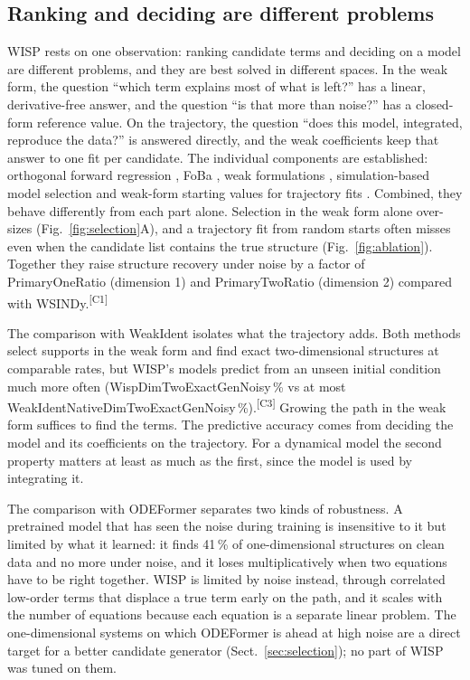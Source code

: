 \documentclass[10pt]{article}
\newcommand{\pv}[1]{\textcolor{prelim}{#1}}
\newcommand{\claimtag}[1]{\textsuperscript{\textcolor{prelim}{\sffamily\tiny[#1]}}}
\newcommand{\pv}[1]{#1}
\newcommand{\claimtag}[1]{}
\newcommand{\m}[1]{\pv{\csname #1\endcsname}}            %
\begin{document}
\subsection{Ranking and deciding are different problems}
WISP rests on one observation: ranking candidate terms and deciding on a model are different problems, and they are
best solved in different spaces. In the weak form, the question ``which term explains most of what is left?'' has a
linear, derivative-free answer, and the question ``is that more than noise?'' has a closed-form reference value. On the
trajectory, the question ``does this model, integrated, reproduce the data?'' is answered directly, and the weak
coefficients keep that answer to one fit per candidate. The individual components are established: orthogonal forward
regression \cite{billings1989}, FoBa \cite{zhang2011}, weak formulations \cite{schaeffer2017,messenger2021mms},
simulation-based model selection \cite{mangan2017,piroddi2003} and weak-form starting values for trajectory fits
\cite{bortz2023}. Combined, they behave differently from each part alone. Selection in the weak form alone over-sizes
(Fig.~\ref{fig:selection}A), and a trajectory fit from random starts often misses even when the candidate list
contains the true structure (Fig.~\ref{fig:ablation}). Together they raise structure recovery under noise by a factor
of \m{PrimaryOneRatio} (dimension 1) and \m{PrimaryTwoRatio} (dimension 2) compared with WSINDy.\claimtag{C1}

The comparison with WeakIdent isolates what the trajectory adds. Both methods select supports in the weak form and find
exact two-dimensional structures at comparable rates, but WISP's models predict from an unseen initial condition much
more often (\m{WispDimTwoExactGenNoisy}\,\% vs at most \m{WeakIdentNativeDimTwoExactGenNoisy}\,\%).\claimtag{C3} Growing
the path in the weak form suffices to find the terms. The predictive accuracy comes from deciding the model and its
coefficients on the trajectory. For a dynamical model the second property matters at least as much as the first,
since the model is used by integrating it.

The comparison with ODEFormer separates two kinds of robustness. A pretrained model that has seen the noise during
training is insensitive to it but limited by what it learned: it finds \pv{41}\,\% of one-dimensional structures on
clean data and no more under noise, and it loses multiplicatively when two equations have to be right together. WISP
is limited by noise instead, through correlated low-order terms that displace a true term early on the path, and it
scales with the number of equations because each equation is a separate linear problem. The one-dimensional systems
on which ODEFormer is ahead at high noise are a direct target for a better candidate generator
(Sect.~\ref{sec:selection}); no part of WISP was tuned on them.
\end{document}
